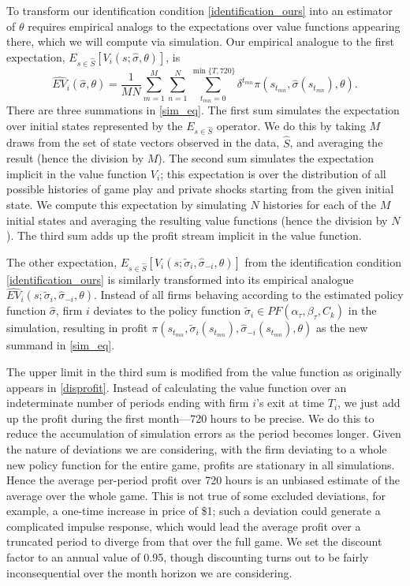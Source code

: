 \documentclass[11pt]{article}
\begin{document}
To transform our identification condition \eqref{identification_ours}
into an estimator of $\theta$ requires empirical analogs to the
expectations over value functions appearing there, which we will
compute via simulation. Our empirical analogue to the first
expectation, $E_{s\in\hat{S}} [ V_{i}(s;\hat{\sigma},\theta )]$, is
\begin{equation}
\label{sim_eq}
\widehat{EV}_i (\hat{\sigma},\theta ) = \frac{1}{MN} \sum_{m = 1}^M
\sum_{n=1}^N \sum_{t_{mn}=0}^{\min\{T,720\}} \delta^{t_{mn}}
\pi(s_{t_{mn}}, \hat{\sigma}(s_{t_{mn}}),\theta).
\end{equation}
There are three summations in \eqref{sim_eq}. The first sum simulates
the expectation over initial states represented by the
$E_{s\in\hat{S}}$ operator. We do this by taking $M$ draws from the
set of state vectors observed in the data, $\hat{S}$, and averaging
the result (hence the division by $M$). The second sum simulates the
expectation implicit in the value function $V_i$; this expectation is
over the distribution of all possible histories of game play and
private shocks starting from the given initial state. We compute this
expectation by simulating $N$ histories for each of the $M$ initial
states and averaging the resulting value functions (hence the division
by $N$). The third sum adds up the profit stream implicit in the value
function.

The other expectation, $E_{s\in\hat{S}} [V_i(s;\tilde{\sigma}_i,
  \hat{\sigma}_{-i}, \theta )]$ from the identification condition
\eqref{identification_ours} is similarly transformed into its
empirical analogue $\widehat{EV}_i (s;\tilde{\sigma}_i,
\hat{\sigma}_{-i}, \theta )$. Instead of all firms behaving according
to the estimated policy function $\hat{\sigma}$, firm $i$ deviates to
the policy function $\tilde{\sigma}_i \in
PF(\alpha_{\tau},\beta_{\tau},C_k)$ in the simulation, resulting in
profit $\pi(s_{t_{mn}}, \tilde{\sigma}_i(s_{t_{mn}}),
\hat{\sigma}_{-i}(s_{t_{mn}}),\theta)$ as the new summand in
\eqref{sim_eq}.

The upper limit in the third sum is modified from the value function
as originally appears in \eqref{disprofit}. Instead of calculating the
value function over an indeterminate number of periods ending with
firm $i$'s exit at time $T_i$, we just add up the profit during the
first month---720 hours to be precise. We do this to reduce the
accumulation of simulation errors as the period becomes longer. Given
the nature of deviations we are considering, with the firm deviating
to a whole new policy function for the entire game, profits are
stationary in all simulations. Hence the average per-period profit
over 720 hours is an unbiased estimate of the average over the whole
game. This is not true of some excluded deviations, for example, a
one-time increase in price of \$1; such a deviation could generate a
complicated impulse response, which would lead the average profit over
a truncated period to diverge from that over the full game. We set the
discount factor to an annual value of 0.95, though discounting turns
out to be fairly inconsequential over the month horizon we are
considering.
\end{document}
